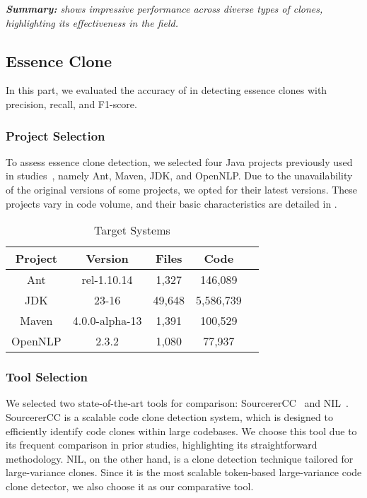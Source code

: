 \begin{titleEnv}
\emph{
\textbf{Summary:}
\toolname shows impressive performance across diverse types of clones, highlighting its effectiveness in the field.
}
\end{titleEnv}



\subsection{Essence Clone}\label{sec:rq2}
In this part, we evaluated the accuracy of \toolname in detecting essence clones with precision, recall, and F1-score. 

\subsubsection{Project Selection}
To assess essence clone detection, we selected four Java projects previously used in studies~\cite{wang2018ccaligner,nil2021}, namely Ant, Maven, JDK, and OpenNLP. 
Due to the unavailability of the original versions of some projects, we opted for their latest versions. 
These projects vary in code volume, and their basic characteristics are detailed in . 

\begin{table}[h]
\centering
\caption{Target Systems}
\begin{tabular}{ccccc}
\hline
\textbf{Project} & \textbf{Version} & \textbf{Files} & \textbf{Code} \\ \hline
Ant &rel-1.10.14 & 1,327  & 146,089 \\
JDK & 23-16 & 49,648  & 5,586,739 \\
Maven & 4.0.0-alpha-13 & 1,391   & 100,529 \\
OpenNLP & 2.3.2 & 1,080  & 77,937 \\ \hline
\end{tabular}
\label{table:targetsystems}
\end{table}


\subsubsection{Tool Selection}
We selected two state-of-the-art tools for comparison: SourcererCC~\cite{sajnani2016sourcerercc} and NIL~\cite{nil2021}. 
SourcererCC is a scalable code clone detection system, which is designed to efficiently identify code clones within large codebases.
We choose this tool due to its frequent comparison in prior studies, highlighting its straightforward methodology. 
NIL, on the other hand, is a clone detection technique tailored for large-variance clones. %
Since it is the most scalable token-based large-variance code clone detector, we also choose it as our comparative tool.

